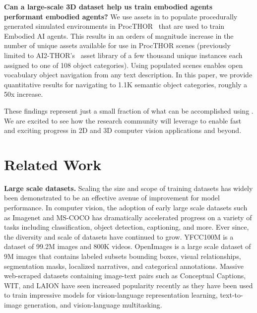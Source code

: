 \textbf{Can a large-scale 3D dataset help us train embodied agents performant embodied agents?
}
We use assets in \data to populate procedurally generated simulated environments in ProcTHOR~\cite{deitke2022procthor} that are used to train Embodied AI agents.
This results in an orders of magnitude increase in the number of unique assets available for use in ProcTHOR scenes (previously limited to AI2-THOR's~\cite{kolve2017ai2thor} asset library of a few thousand unique instances each assigned to one of 108 object categories).
Using \data populated scenes enables open vocabulary object navigation from any text description. In this paper, we provide quantitative results for navigating to 1.1K semantic object categories, roughly a 50x increase.  %

These findings represent just a small fraction of what can be accomplished using \data. We are excited to see how the research community will leverage \data to enable fast and exciting progress in 2D and 3D computer vision applications and beyond.

\vspace{-0.05in}

\section{Related Work}
\label{sec:related-work}

\textbf{Large scale datasets.} 
Scaling the size and scope of training datasets has widely been demonstrated to be an effective avenue of improvement for model performance. In computer vision, the adoption of early large scale datasets such as Imagenet\cite{russakovsky2015imagenet,deng2009imagenet} and MS-COCO\cite{lin2014microsoft} has dramatically accelerated progress on a variety of tasks including classification, object detection, captioning, and more. Ever since, the diversity and scale of datasets have continued to grow. YFCC100M is a dataset of 99.2M images and 800K videos\cite{thomee2016yfcc100m}. OpenImages\cite{kuznetsova2020open} is a large scale dataset of 9M images that contains labeled subsets bounding boxes, visual relationships, segmentation masks, localized narratives, and categorical annotations. Massive web-scraped datasets containing image-text pairs such as Conceptual Captions\cite{sharma2018conceptual}, WIT\cite{srinivasan2021wit}, and LAION\cite{schuhmann2021laion,schuhmann2022laion} have seen increased popularity recently as they have been used to train impressive models for vision-language representation learning\cite{radford2021learning,ilharco_gabriel_2021_5143773,jia2021scaling}, text-to-image generation\cite{ramesh2021zero,ramesh2022hierarchical,rombach2022high,jia2021scaling}, and vision-language multitasking\cite{cho2021unifying,tan2019lxmert,wang2022image,chen2022pali}.

